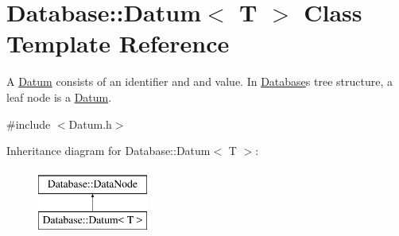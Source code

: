 \hypertarget{classDatabase_1_1Datum}{}\section{Database\+:\+:Datum$<$ T $>$ Class Template Reference}
\label{classDatabase_1_1Datum}


A \hyperlink{classDatabase_1_1Datum}{Datum} consists of an identifier and and value. In \hyperlink{namespaceDatabase}{Database}\textquotesingle{}s tree structure, a leaf node is a \hyperlink{classDatabase_1_1Datum}{Datum}.  




{\ttfamily \#include $<$Datum.\+h$>$}

Inheritance diagram for Database\+:\+:Datum$<$ T $>$\+:\begin{figure}[H]
\begin{center}
\leavevmode
\includegraphics[height=2.000000cm]{classDatabase_1_1Datum}
\end{center}
\end{figure}
